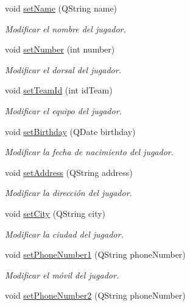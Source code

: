 \begin{DoxyCompactItemize}
void \mbox{\hyperlink{classjugador_a0dcf58840f95ad87661987f7750c4355}{set\+Name}} (Q\+String name)
\begin{DoxyCompactList}\small\item\em Modificar el nombre del jugador. \end{DoxyCompactList}\item 
void \mbox{\hyperlink{classjugador_aa393b3dfb2eb1f269e66eb0b9e673973}{set\+Number}} (int number)
\begin{DoxyCompactList}\small\item\em Modificar el dorsal del jugador. \end{DoxyCompactList}\item 
void \mbox{\hyperlink{classjugador_ae853f109166a05c832bb89f84cc7408c}{set\+Team\+Id}} (int id\+Team)
\begin{DoxyCompactList}\small\item\em Modificar el equipo del jugador. \end{DoxyCompactList}\item 
void \mbox{\hyperlink{classjugador_ac974fe74ff98272b5652de36e5ba4680}{set\+Birthday}} (Q\+Date birthday)
\begin{DoxyCompactList}\small\item\em Modificar la fecha de nacimiento del jugador. \end{DoxyCompactList}\item 
void \mbox{\hyperlink{classjugador_a1e4da4c657e46c0368f1db72ce102d93}{set\+Address}} (Q\+String address)
\begin{DoxyCompactList}\small\item\em Modificar la dirección del jugador. \end{DoxyCompactList}\item 
void \mbox{\hyperlink{classjugador_ae00869eb01324db252abe1b2df0032bc}{set\+City}} (Q\+String city)
\begin{DoxyCompactList}\small\item\em Modificar la ciudad del jugador. \end{DoxyCompactList}\item 
void \mbox{\hyperlink{classjugador_aaa04ccc1da6c45dea35b723a54e217d4}{set\+Phone\+Number1}} (Q\+String phone\+Number)
\begin{DoxyCompactList}\small\item\em Modificar el móvil del jugador. \end{DoxyCompactList}\item 
void \mbox{\hyperlink{classjugador_a7541a8d0d7df4c5cc1fc49b15cd24da3}{set\+Phone\+Number2}} (Q\+String phone\+Number)

\end{DoxyCompactItemize}
